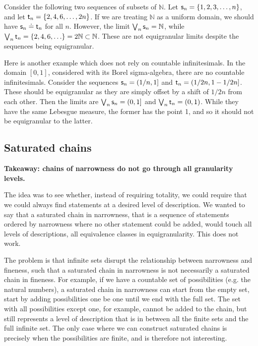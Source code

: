 \documentclass[10pt, onecolumn, longbibliography, nofootinbib]{revtex4-2}
\begin{document}
Consider the following two sequences of subsets of $\mathbb{N}$. Let $\stmt_n = \{1,2,3,\ldots,n\}$, and let $\stmt[t]_n = \{2,4,6,\ldots,2n\}$. If we are treating $\mathbb{N}$ as a uniform domain, we should have $\stmt_n\eqgran\stmt[t]_n$ for all $n$. However, the limit $\bigOR_n\stmt_n = \mathbb{N}$, while $\bigOR_n\stmt[t]_n = \{2,4,6,\ldots\} = 2\mathbb{N} \subset \mathbb{N}$. These are not equigranular limits despite the sequences being equigranular. 

Here is another example which does not rely on countable infinitesimals. In the domain $[0,1]$, considered with its Borel sigma-algebra, there are no countable infinitesimals. Consider the sequences $\stmt_n = (1/n,1]$ and $\stmt[t]_n = (1/2n, 1 - 1/2n]$. These should be equigranular as they are simply offset by a shift of $1/2n$ from each other. Then the limits are $\bigOR_n\stmt_n = (0,1]$ and $\bigOR_n\stmt[t]_n = (0,1)$. While they have the same Lebesgue measure, the former has the point 1, and so it should not be equigranular to the latter.


\subsection{Saturated chains}

\textbf{Takeaway: chains of narrowness do not go through all granularity levels.}

The idea was to see whether, instead of requiring totality, we could require that we could always find statements at a desired level of description. We wanted to say that a saturated chain in narrowness, that is a sequence of statements ordered by narrowness where no other statement could be added, would touch all levels of descriptions, all equivalence classes in equigranularity. This does not work.

The problem is that infinite sets disrupt the relationship between narrowness and fineness, such that a saturated chain in narrowness is not necessarily a saturated chain in fineness. For example, if we have a countable set of possibilities (e.g. the natural numbers), a saturated chain in narrowness can start from the empty set, start by adding possibilities one be one until we end with the full set. The set with all possibilities except one, for example, cannot be added to the chain, but still represents a level of description that is in between all the finite sets and the full infinite set. The only case where we can construct saturated chains is precisely when the possibilities are finite, and is therefore not interesting.
\end{document}
